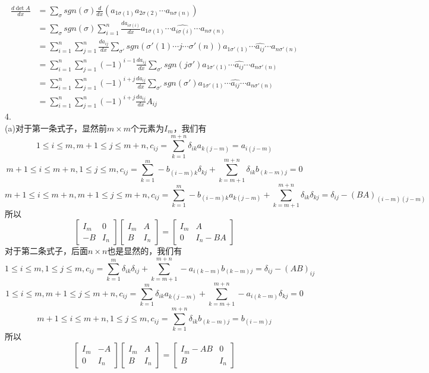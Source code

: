 \documentclass[utf8]{ctexart}
\begin{document}
\begin{align*}
	\frac{d\det A}{dx}&=\sum\limits_{\sigma}sgn(\sigma)\frac{d}{dx}(a_{1\sigma(1)}a_{2\sigma(2)}\cdots a_{n\sigma(n)})\\
	&=\sum\limits_{\sigma}sgn(\sigma)\sum\limits_{i=1}^n\frac{da_{i\sigma(i)}}{dx}a_{1\sigma(1)}\cdots\widehat{a_{i\sigma(i)}}\cdots a_{n\sigma(n)}\\
	&=\sum\limits_{i=1}^n\sum\limits_{j=1}^n\frac{da_{ij}}{dx}\sum\limits_{\sigma'}sgn(\sigma'(1)\cdots j\cdots\sigma'(n))a_{1\sigma'(1)}\cdots\widehat{a_{ij}}\cdots a_{n\sigma'(n)}\\
	&=\sum\limits_{i=1}^n\sum\limits_{j=1}^n(-1)^{i-1}\frac{da_{ij}}{dx}\sum\limits_{\sigma'}sgn(j\sigma')a_{1\sigma'(1)}\cdots\widehat{a_{ij}}\cdots a_{n\sigma'(n)}\\
	&=\sum\limits_{i=1}^n\sum\limits_{j=1}^n(-1)^{i+j}\frac{da_{ij}}{dx}\sum\limits_{\sigma'}sgn(\sigma')a_{1\sigma'(1)}\cdots\widehat{a_{ij}}\cdots a_{n\sigma'(n)}\\
	&=\sum\limits_{i=1}^n\sum\limits_{j=1}^n(-1)^{i+j}\frac{da_{ij}}{dx}A_{ij}
\end{align*}
4.\\
(a)对于第一条式子，显然前$m\times m$个元素为$I_m$，我们有
\[1\le i\le m,m+1\le j\le m+n,c_{ij}=\sum\limits_{k=1}^{m+n}\delta_{ik}a_{k(j-m)}=a_{i(j-m)}\]
\[m+1\le i\le m+n,1\le j\le m,c_{ij}=\sum\limits_{k=1}^{m}-b_{(i-m)k}\delta_{kj}+\sum\limits_{k=m+1}^{m+n}\delta_{ik}b_{(k-m)j}=0\]
\[m+1\le i\le m+n,m+1\le j\le m+n,c_{ij}=\sum\limits_{k=1}^{m}-b_{(i-m)k}a_{k(j-m)}+\sum\limits_{k=m+1}^{m+n}\delta_{ik}\delta_{kj}=\delta_{ij}-(BA)_{(i-m)(j-m)}\]
所以
\[\begin{bmatrix}
	I_m&0\\
	-B&I_n
\end{bmatrix}
\begin{bmatrix}
	I_m&A\\
	B&I_n
\end{bmatrix}
=\begin{bmatrix}
	I_m&A\\
	0&I_n-BA
\end{bmatrix}\]
对于第二条式子，后面$n\times n$也是显然的，我们有
\[1\le i\le m,1\le j\le m,c_{ij}=\sum\limits_{k=1}^{m}\delta_{ik}\delta_{ij}+\sum\limits_{k=m+1}^{m+n}-a_{i(k-m)}b_{(k-m)j}=\delta_{ij}-(AB)_{ij}\]
\[1\le i\le m,m+1\le j\le m+n,c_{ij}=\sum\limits_{k=1}^{m}\delta_{ik}a_{k(j-m)}+\sum\limits_{k=m+1}^{m+n}-a_{i(k-m)}\delta_{kj}=0\]
\[m+1\le i\le m+n,1\le j\le m,c_{ij}=\sum\limits_{k=1}^{m+n}\delta_{ik}b_{(k-m)j}=b_{(i-m)j}\]
所以
\[\begin{bmatrix}
	I_m&-A\\
	0&I_n
\end{bmatrix}
\begin{bmatrix}
	I_m&A\\
	B&I_n
\end{bmatrix}
=\begin{bmatrix}
	I_m-AB&0\\
	B&I_n
\end{bmatrix}\]
\end{document}
